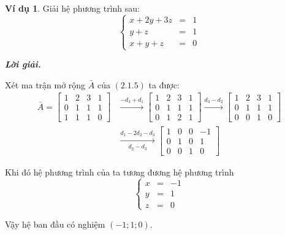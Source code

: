 \documentclass[12pt,a4paper,oneside]{book}
\theoremstyle{theorem}
\theoremstyle{definition}
\newtheorem{vd}[theorem2]{Ví dụ}
\begin{document}
\begin{vd}
Giải hệ phương trình sau: \begin{equation}
\left\{
\begin{array}{lcl}
x + 2y +3z &=&1 \\
y+z&=&1 \\
x+y+z &=&0 
\end{array}
\right.
\end{equation}

\textbf{\textit{Lời giải.}}   

Xét ma trận mở rộng $\bar{A}$ của $(2.1.5)$ ta được:
\begin{align*}
\bar{A}=\left[
\begin{array}{lcl|c}
1 & 2&3 &1 \\
0&1&1&1 \\
1&1&1 &0 
\end{array}
\right]&\xrightarrow[]{-d_3+d_1}\left[
\begin{array}{lcl|c}
1 & 2&3 &1 \\
0&1&1&1 \\
0&1&2 &1 
\end{array}
\right]\xrightarrow[]{d_3-d_2}\left[
\begin{array}{lcl|c}
1 & 2&3 &1 \\
0&1&1&1 \\
0&0&1 &0 
\end{array}
\right]\\&\xrightarrow[d_2-d_3]{d_1-2d_2-d_3}\left[
\begin{array}{lcl|c}
1 & 0&0 &-1 \\
0&1&0&1 \\
0&0&1 &0 
\end{array}
\right]\end{align*}

Khi đó hệ phương trình của ta tương đương hệ phương trình
\[\left\{
\begin{array}{lcl}
x  &=&-1 \\
y&=&1 \\
z&=&0
\end{array}
\right.\]

Vậy hệ ban đầu có nghiệm $(-1;1;0)$.
\end{vd}
\end{document}
